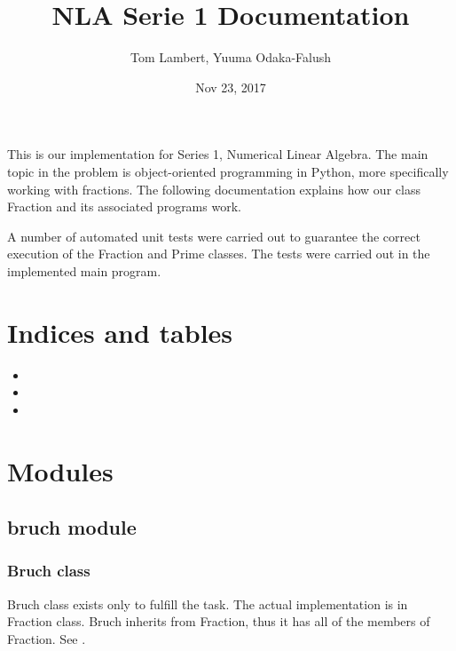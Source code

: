 \documentclass[letterpaper,10pt,english]{sphinxmanual}
\title{NLA Serie 1 Documentation}
\date{Nov 23, 2017}
\author{Tom Lambert, Yuuma Odaka-Falush}
\begin{document}
\maketitle
\sphinxtableofcontents
{}\label{\detokenize{index::doc}}


This is our implementation for Series 1, Numerical Linear Algebra.
The main topic in the problem is object-oriented programming in Python, more specifically working with fractions.
The following documentation explains how our class Fraction and its associated programs work.

A number of automated unit tests were carried out to guarantee the correct execution of the Fraction and Prime classes.
The tests were carried out in the implemented main program.


\chapter{Indices and tables}
\label{\detokenize{index:welcome-to-nla-series-1-s-documentation}}\label{\detokenize{index:indices-and-tables}}\begin{itemize}
\item {} 

\item {} 

\item {} 

\end{itemize}


\chapter{Modules}
\label{\detokenize{index:modules}}

\section{bruch module}
\label{\detokenize{bruch::doc}}\label{\detokenize{bruch:bruch-module}}

\subsection{Bruch class}
\label{\detokenize{bruch:bruch-class}}
Bruch class exists only to fulfill the task. The actual implementation is in Fraction class.
Bruch inherits from Fraction, thus it has all of the members of Fraction.
See {\hyperref[\detokenize{fraction:fraction-class}]{}}.
\label{\detokenize{bruch:module-bruch}}
\end{document}
